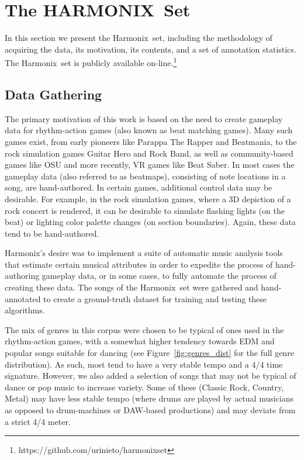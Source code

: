 \documentclass{article}
\newcommand{\setNameUpper}{HARMONIX}
\newcommand{\setName}{Harmonix}
\begin{document}
\section{The \setNameUpper~Set}\label{sec:dataset}

In this section we present the \setName~set, including the methodology of acquiring the data, its motivation, its contents, and a set of annotation statistics.
The \setName~set is publicly available on-line.\footnote{https://github.com/urinieto/harmonixset}

\subsection{Data Gathering}

The primary motivation of this work is based on the need to create gameplay data for rhythm-action games (also known as beat matching games). Many such games exist, from early pioneers like Parappa The Rapper and Beatmania, to the rock simulation games Guitar Hero and Rock Band, as well as community-based games like OSU and more recently, VR games like Beat Saber. In most cases the gameplay data (also referred to as beatmaps), consisting of note locations in a song, are hand-authored. In certain games, additional control data may be desirable. For example, in the rock simulation games, where a 3D depiction of a rock concert is rendered, it can be desirable to simulate flashing lights (on the beat) or lighting color palette changes (on section boundaries). Again, these data tend to be hand-authored.

Harmonix's desire was to implement a suite of automatic music analysis tools that estimate certain musical attributes in order to expedite the process of hand-authoring gameplay data, or in some cases, to fully automate the process of creating these data. The songs of the \setName~set were gathered and hand-annotated to create a ground-truth dataset for training and testing these algorithms.

The mix of genres in this corpus were chosen to be typical of ones used in the rhythm-action games, with a somewhat higher tendency towards EDM and popular songs suitable for dancing (see Figure~\ref{fig:genres_dist} for the full genre distribution).
As such, most tend to have a very stable tempo and a 4/4 time signature. 
However, we also added a selection of songs that may not be typical of dance or pop music to increase variety.
Some of these (Classic Rock, Country, Metal) may have less stable tempo (where drums are played by actual musicians as opposed to drum-machines or DAW-based productions) and may deviate from a strict 4/4 meter. 
\end{document}
